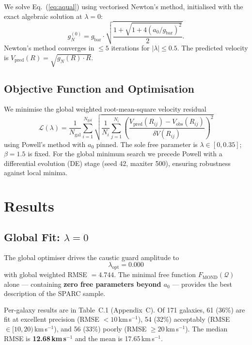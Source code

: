 \documentclass{aa}
\newcommand{\Q}{\mathcal{Q}}
\newcommand{\kms}{km\,s$^{-1}$}
\newcommand{\Fmond}{F_\text{MOND}}
\newcommand{\gbar}{g_\text{bar}}
\newcommand{\gN}{g_N}
\newcommand{\azero}{a_0}
\newcommand{\lopt}{\lambda_\text{opt}}
\begin{document}
We solve Eq.~(\ref{eq:aqual}) using vectorised Newton's method, initialised
with the exact algebraic solution at $\lambda = 0$:
\begin{equation}
  \gN^{(0)} = \gbar \cdot \sqrt{\frac{1 + \sqrt{1 + 4(\azero/\gbar)^2}}{2}}.
\end{equation}
Newton's method converges in $\leq 5$ iterations for $|\lambda| \leq 0.5$.
The predicted velocity is $V_\text{pred}(R) = \sqrt{\gN(R) \cdot R}$.

\subsection{Objective Function and Optimisation}

We minimise the global weighted root-mean-square velocity residual
\begin{equation}
  \mathcal{L}(\lambda) = \frac{1}{N_\text{gal}}
    \sum_{i=1}^{N_\text{gal}}
    \sqrt{
      \frac{1}{N_i} \sum_{j=1}^{N_i}
      \left(
        \frac{V_\text{pred}(R_{ij}) - V_\text{obs}(R_{ij})}{\delta V(R_{ij})}
      \right)^2
    }
  \label{eq:objective}
\end{equation}
using Powell's method with $\azero$ pinned. The sole free parameter is
$\lambda \in [0, 0.35]$; $\beta = 1.5$ is fixed. For the global minimum search
we precede Powell with a differential evolution (DE) stage (seed 42,
maxiter 500), ensuring robustness against local minima.

\section{Results}
\label{sec:results}

\subsection{Global Fit: $\lambda = 0$}
\label{sec:globalfit}

The global optimiser drives the caustic guard amplitude to
\begin{equation}
  \boxed{\lopt = 0.000}
\end{equation}
with global weighted RMSE $= 4.744$. The minimal free function
$\Fmond(\Q)$ alone --- containing \textbf{zero free parameters beyond
$\azero$} --- provides the best description of the SPARC sample.

Per-galaxy results are in Table~C.1 (Appendix~C). Of 171 galaxies, 61 (36\%)
are fit at excellent precision (RMSE $< 10$\,\kms), 54 (32\%) acceptably
(RMSE $\in [10, 20)$\,\kms), and 56 (33\%) poorly (RMSE $\geq 20$\,\kms).
The median RMSE is \textbf{12.68\,\kms} and the mean is 17.65\,\kms.
\end{document}
